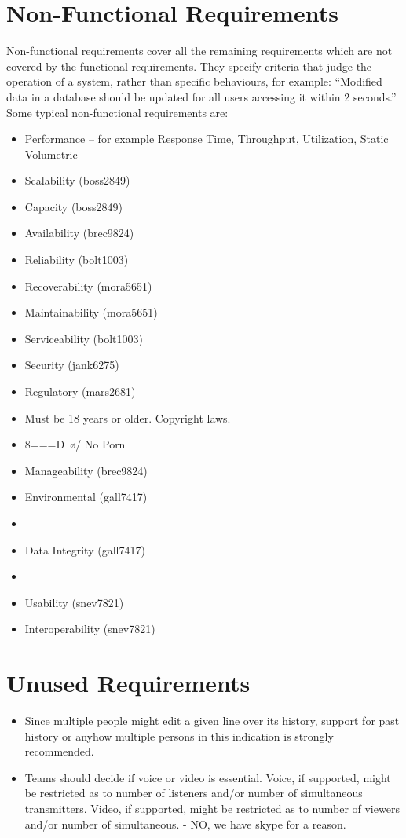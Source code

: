 \documentclass[11pt]{report}
\begin{document}
\section{Non-Functional Requirements}
    Non-functional requirements cover all the remaining requirements which are not covered by the functional requirements. They specify criteria that judge the operation of a system, rather than specific behaviours, for example: ``Modified data in a database should be updated for all users accessing it within 2 seconds.'' Some typical non-functional requirements are:
    \begin{itemize}
        \item Performance – for example Response Time, Throughput, Utilization, Static Volumetric
        \item Scalability (boss2849)
        \item Capacity (boss2849)
        \item Availability (brec9824)
        \item Reliability (bolt1003)
        \item Recoverability (mora5651)
        \item Maintainability (mora5651)
        \item Serviceability (bolt1003)
        \item Security (jank6275)
        \item Regulatory (mars2681) 
            \item Must be 18 years or older. Copyright laws. 
            \item 8===D~\o/ No Porn
        \item Manageability (brec9824)
        \item Environmental (gall7417)
            \item 
        \item Data Integrity (gall7417)
            \item 
        \item Usability (snev7821)
        \item Interoperability (snev7821)
    \end{itemize}

\section{Unused Requirements}
    \begin{itemize}
        \item Since multiple people might edit a given line over its history, support for past history or anyhow multiple persons in this indication is strongly recommended.
        \item Teams should decide if voice or video is essential. Voice, if supported, might be restricted as to number of listeners and/or number of simultaneous transmitters. Video, if supported, might be restricted as to number of viewers and/or number of simultaneous. - NO, we have skype for a reason.
    \end{itemize}
    
\end{document}
